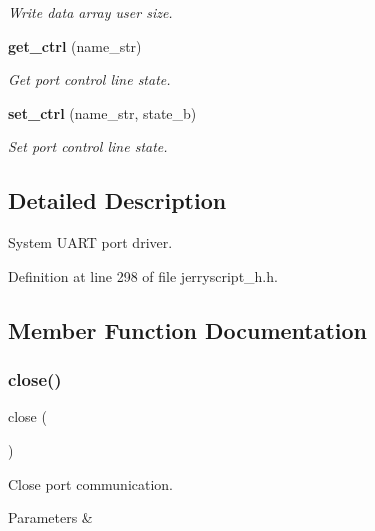 \begin{DoxyCompactItemize}
\begin{DoxyCompactList}\small\item\em Write data array user size. \end{DoxyCompactList}\item 
\textbf{ get\+\_\+ctrl} (name\+\_\+str)
\begin{DoxyCompactList}\small\item\em Get port control line state. \end{DoxyCompactList}\item 
\textbf{ set\+\_\+ctrl} (name\+\_\+str, state\+\_\+b)
\begin{DoxyCompactList}\small\item\em Set port control line state. \end{DoxyCompactList}\end{DoxyCompactItemize}


\subsection{Detailed Description}
System U\+A\+RT port driver. 

Definition at line 298 of file jerryscript\+\_\+h.\+h.



\subsection{Member Function Documentation}
\mbox{\label{classuart_aa69c8bf1f1dcf4e72552efff1fe3e87e}} 
\subsubsection{close()}
{\footnotesize\ttfamily close (\begin{DoxyParamCaption}{ }\end{DoxyParamCaption})}



Close port communication. 


\begin{DoxyCode}{0}
\end{DoxyCode}



\begin{DoxyParams}{Parameters}
{\em } & \\
\hline
\end{DoxyParams}
\mbox{\label{classuart_a8a563dc7cad903afc951acca9efc37f2}} 
